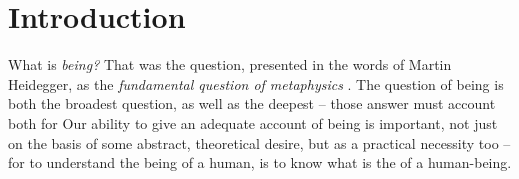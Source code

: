 \chapter{Introduction}





What is \emph{being?}  That was the question, presented in the words of Martin Heidegger, as the \emph{fundamental question of metaphysics} \autocite[1]{Heidegger}. The question of being is both the broadest question, as well as the deepest -- those answer must account both for  Our ability to give an adequate account of being is important, not just on the basis of some abstract, theoretical desire, but as a practical necessity too -- for to understand the being of a human, is to know what is the  of a human-being. 


